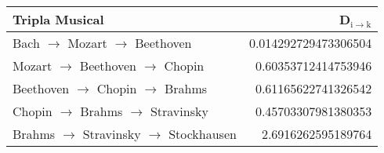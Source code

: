 \documentclass[11pt]{article}
\begin{document}
\begin{center}
\begin{tabular}{lr}
 Tripla Musical                             &  D$_{\mathrm{i \to k}}$  \\
\hline
 Bach $\to$ Mozart $\to$ Beethoven          &    0.014292729473306504  \\
 Mozart $\to$ Beethoven $\to$ Chopin        &     0.60353712414753946  \\
 Beethoven $\to$ Chopin $\to$ Brahms        &     0.61165622741326542  \\
 Chopin $\to$ Brahms $\to$ Stravinsky       &     0.45703307981380353  \\
 Brahms $\to$ Stravinsky $\to$ Stockhausen  &      2.6916262595189764  \\
\end{tabular}
\end{center}
\end{document}
